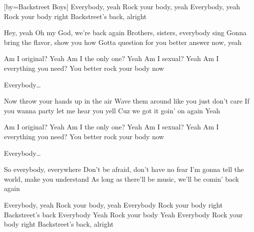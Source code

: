 [by={Backstreet Boys}]
\beginchorus
Everybody, yeah
Rock your body, yeah
Everybody, yeah
Rock your body right
Backstreet's back, alright
\endchorus 

\beginverse
Hey, yeah
Oh my God, we're back again
Brothers, sisters, everybody sing
Gonna bring the flavor, show you how
Gotta question for you better answer now, yeah
\endverse

\beginchorus
Am I original?
Yeah
Am I the only one?
Yeah
Am I sexual?
Yeah
Am I everything you need?
You better rock your body now
\endchorus 

\beginchorus
Everybody\dots
\endchorus 

\beginverse
Now throw your hands up in the air
Wave them around like you just don't care
If you wanna party let me hear you yell
Cuz we got it goin' on again
Yeah
\endverse

\beginchorus
Am I original?
Yeah
Am I the only one?
Yeah
Am I sexual?
Yeah
Am I everything you need?
You better rock your body now
\endchorus 

\beginchorus
Everybody\dots
\endchorus 

\beginverse
So everybody, everywhere
Don't be afraid, don't have no fear
I'm gonna tell the world, make you understand
As long as there'll be music, we'll be comin' back again
\endverse

\beginchorus
Everybody, yeah
Rock your body, yeah
Everybody
Rock your body right 
Backstreet's back
Everybody 
Yeah 
Rock your body 
Yeah 
Everybody 
Rock your body right 
Backstreet's back, alright
\endchorus 
\endsong